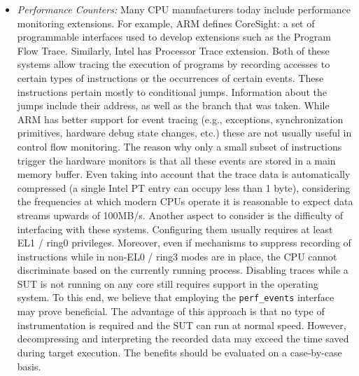 \begin{itemize}
    \item \textit{Performance Counters:} Many CPU manufacturers today include performance monitoring extensions. For example, ARM defines CoreSight: a set of programmable interfaces used to develop extensions such as the Program Flow Trace. Similarly, Intel has Processor Trace extension. Both of these systems allow tracing the execution of programs by recording accesses to certain types of instructions or the occurrences of certain events. These instructions pertain mostly to conditional jumps. Information about the jumps include their address, as well as the branch that was taken. While ARM has better support for event tracing (e.g., exceptions, synchronization primitives, hardware debug state changes, etc.) these are not usually useful in control flow monitoring. The reason why only a small subset of instructions trigger the hardware monitors is that all these events are stored in a main memory buffer. Even taking into account that the trace data is automatically compressed (a single Intel PT entry can occupy less than 1 byte), considering the frequencies at which modern CPUs operate it is reasonable to expect data streams upwards of 100MB/s. Another aspect to consider is the difficulty of interfacing with these systems. Configuring them usually requires at least EL1 / ring0 privileges. Moreover, even if mechanisms to suppress recording of instructions while in non-EL0 / ring3 modes are in place, the CPU cannot discriminate based on the currently running process. Disabling traces while a SUT is not running on any core still requires support in the operating system. To this end, we believe that employing the \texttt{perf\_events} interface may prove beneficial. The advantage of this approach is that no type of instrumentation is required and the SUT can run at normal speed. However, decompressing and interpreting the recorded data may exceed the time saved during target execution. The benefits should be evaluated on a case-by-case basis.
\end{itemize}

